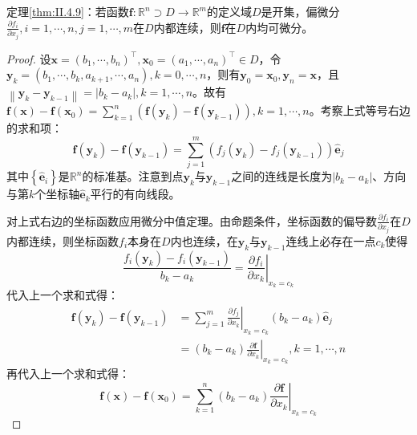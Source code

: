 \documentclass[main.tex]{subfiles}
\begin{document}
\begin{theorem*}[充分条件]
    定理\ref{thm:II.4.9}：若函数$\mathbf{f}:\mathbb{R}^n\supset D\rightarrow\mathbb{R}^m$的定义域$D$是开集，偏微分$\frac{\partial f_i}{\partial x_j},i=1,\cdots,n,j=1,\cdots,m$在$D$内都连续，则$\mathbf{f}$在$D$内均可微分。
\end{theorem*}
\begin{proof}
    设$\mathbf{x}=\left(b_1,\cdots,b_n\right)^\intercal,\mathbf{x}_0=\left(a_1,\cdots,a_n\right)^\intercal\in D$，令$\mathbf{y}_k=\left(b_1,\cdots,b_k,a_{k+1},\cdots,a_n\right),k=0,\cdots,n$，则有$\mathbf{y}_0=\mathbf{x}_0,\mathbf{y}_n=\mathbf{x}$，且$\left\|\mathbf{y}_k-\mathbf{y}_{k-1}\right\|=\left|b_k-a_k\right|,k=1,\cdots,n$。故有$\mathbf{f}\left(\mathbf{x}\right)-\mathbf{f}\left(\mathbf{x}_0\right)=\sum_{k=1}^n\left(\mathbf{f}\left(\mathbf{y}_k\right)-\mathbf{f}\left(\mathbf{y}_{k-1}\right)\right),k=1,\cdots,n$。考察上式等号右边的求和项：
    \[\mathbf{f}\left(\mathbf{y}_k\right)-\mathbf{f}\left(\mathbf{y}_{k-1}\right)=\sum_{j=1}^m\left(f_j\left(\mathbf{y}_k\right)-f_j\left(\mathbf{y}_{k-1}\right)\right)\mathbf{\hat{e}}_j
    \]
    其中$\left\{\mathbf{\hat{e}}_i\right\}$是$\mathbb{R}^n$的标准基。注意到点$\mathbf{y}_k$与$\mathbf{y}_{k-1}$之间的连线是长度为$\left|b_k-a_k\right|$、方向与第$k$个坐标轴$\mathbf{\hat{e}}_k$平行的有向线段。

    对上式右边的坐标函数应用微分中值定理。由命题条件，坐标函数的偏导数$\frac{\partial f_i}{\partial x_j}$在$D$内都连续，则坐标函数$f_i$本身在$D$内也连续，在$\mathbf{y}_k$与$\mathbf{y}_{k-1}$连线上必存在一点$c_k$使得
    \[\frac{f_i\left(\mathbf{y}_k\right)-f_i\left(\mathbf{y}_{k-1}\right)}{b_k-a_k}=\left.\frac{\partial f_i}{\partial x_k}\right|_{x_k=c_k}\]
    代入上一个求和式得：
    \begin{align*}
        \mathbf{f}\left(\mathbf{y}_k\right)-\mathbf{f}\left(\mathbf{y}_{k-1}\right) & =\sum_{j=1}^m\left.\frac{\partial f_j}{\partial x_k}\right|_{x_k=c_k}\left(b_k-a_k\right)\mathbf{\hat{e}}_j \\
                                                                                    & =\left(b_k-a_k\right)\left.\frac{\partial \mathbf{f}}{\partial x_k}\right|_{x_k=c_k},k=1,\cdots,n
    \end{align*}
    再代入上一个求和式得：
    \[\mathbf{f}\left(\mathbf{x}\right)-\mathbf{f}\left(\mathbf{x}_0\right)=\sum_{k=1}^n\left(b_k-a_k\right)\left.\frac{\partial \mathbf{f}}{\partial x_k}\right|_{x_k=c_k}
    \]


\end{proof}
\end{document}

